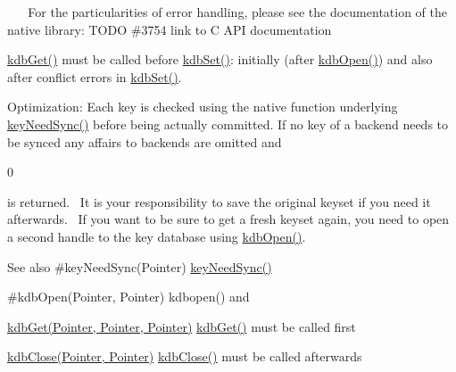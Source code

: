 ~\newline
 ~\newline
 For the particularities of error handling, please see the documentation of the native library\+: T\+O\+DO \#3754 link to C A\+PI documentation

\hyperlink{interfaceorg_1_1libelektra_1_1Elektra_a09ad2a446a215b6cce4cfb31d9871ac2}{kdb\+Get()} must be called before \hyperlink{interfaceorg_1_1libelektra_1_1Elektra_a7b69b22fd8b712891d188215707e0540}{kdb\+Set()}\+: initially (after \hyperlink{}{kdb\+Open()}) and also after conflict errors in \hyperlink{interfaceorg_1_1libelektra_1_1Elektra_a7b69b22fd8b712891d188215707e0540}{kdb\+Set()}.

Optimization\+: Each key is checked using the native function underlying \hyperlink{}{key\+Need\+Sync()} before being actually committed. If no key of a backend needs to be synced any affairs to backends are omitted and
\begin{DoxyCode}
0 
\end{DoxyCode}
 is returned.~\newline
 It is your responsibility to save the original keyset if you need it afterwards.~\newline
 If you want to be sure to get a fresh keyset again, you need to open a second handle to the key database using \hyperlink{interfaceorg_1_1libelektra_1_1Elektra_a32639cf92429fe65bf3744a007d8647f}{kdb\+Open()}.

\begin{DoxySeeAlso}{See also}
\#key\+Need\+Sync(\+Pointer) \hyperlink{group__keytest_gaf247df0de7aca04b32ef80e39ef12950}{key\+Need\+Sync()} 

\#kdb\+Open(\+Pointer, Pointer) kdbopen() and 

\hyperlink{interfaceorg_1_1libelektra_1_1Elektra_a09ad2a446a215b6cce4cfb31d9871ac2}{kdb\+Get(\+Pointer, Pointer, Pointer)} \hyperlink{interfaceorg_1_1libelektra_1_1Elektra_a09ad2a446a215b6cce4cfb31d9871ac2}{kdb\+Get()} must be called first 

\hyperlink{interfaceorg_1_1libelektra_1_1Elektra_a60cf0c7cefd0a6a34b4608bdc5eded4b}{kdb\+Close(\+Pointer, Pointer)} \hyperlink{interfaceorg_1_1libelektra_1_1Elektra_a60cf0c7cefd0a6a34b4608bdc5eded4b}{kdb\+Close()} must be called afterwards
\end{DoxySeeAlso}

